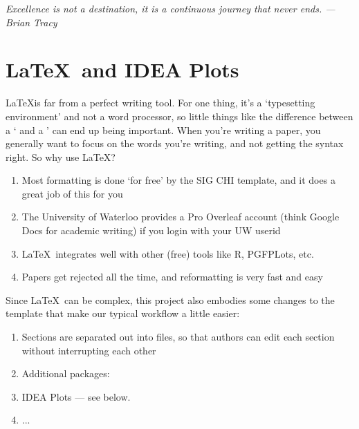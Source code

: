 
\vspace{2em}
\begin{center}
    \emph{Excellence is not a destination, it is a continuous journey that never ends.  --- Brian Tracy}
\end{center}

\section{\LaTeX\ and IDEA Plots}

\LaTeX is far from a perfect writing tool. For one thing, it's a `typesetting environment' and not a word processor, so little things like the difference between a ` and a ' can end up being important. When you're writing a paper, you generally want to focus on the words you're writing, and not getting the syntax right. So why use \LaTeX?

\begin{enumerate}
    \item Most formatting is done `for free' by the SIG CHI template, and it does a great job of this for you
    \item The University of Waterloo provides a Pro Overleaf account (think Google Docs for academic writing) if you login with your UW userid
    \item \LaTeX\ integrates well with other (free) tools like R, PGFPLots, etc. 
    \item Papers get rejected all the time, and reformatting is very fast and easy
\end{enumerate}

Since \LaTeX\ can be complex, this project also embodies some changes to the template that make our typical workflow a little easier:

\begin{enumerate}
    \item Sections are separated out into files, so that authors can edit each section without interrupting each other
    \item Additional packages:
    \item IDEA Plots --- see below. 
    \item ... 
\end{enumerate}



